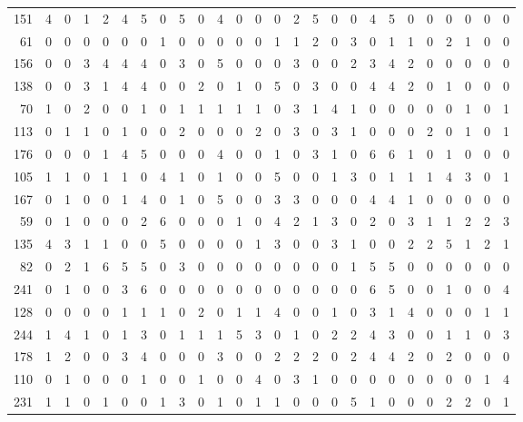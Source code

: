 \begin{longtable}{@{\extracolsep{\fill}}rccccccccccccccccccccccccc@{}}
151 & 4 & 0 & 1 & 2 & 4 & 5 & 0 & 5 & 0 & 4 & 0 & 0 & 0 & 2 & 5 & 0 & 0 & 4 & 5 & 0 & 0 & 0 & 0 & 0 & 0 \\
61 & 0 & 0 & 0 & 0 & 0 & 0 & 1 & 0 & 0 & 0 & 0 & 0 & 1 & 1 & 2 & 0 & 3 & 0 & 1 & 1 & 0 & 2 & 1 & 0 & 0 \\
156 & 0 & 0 & 3 & 4 & 4 & 4 & 0 & 3 & 0 & 5 & 0 & 0 & 0 & 3 & 0 & 0 & 2 & 3 & 4 & 2 & 0 & 0 & 0 & 0 & 0 \\
138 & 0 & 0 & 3 & 1 & 4 & 4 & 0 & 0 & 2 & 0 & 1 & 0 & 5 & 0 & 3 & 0 & 0 & 4 & 4 & 2 & 0 & 1 & 0 & 0 & 0 \\
70 & 1 & 0 & 2 & 0 & 0 & 1 & 0 & 1 & 1 & 1 & 1 & 1 & 0 & 3 & 1 & 4 & 1 & 0 & 0 & 0 & 0 & 0 & 1 & 0 & 1 \\
113 & 0 & 1 & 1 & 0 & 1 & 0 & 0 & 2 & 0 & 0 & 0 & 2 & 0 & 3 & 0 & 3 & 1 & 0 & 0 & 0 & 2 & 0 & 1 & 0 & 1 \\
176 & 0 & 0 & 0 & 1 & 4 & 5 & 0 & 0 & 0 & 4 & 0 & 0 & 1 & 0 & 3 & 1 & 0 & 6 & 6 & 1 & 0 & 1 & 0 & 0 & 0 \\
105 & 1 & 1 & 0 & 1 & 1 & 0 & 4 & 1 & 0 & 1 & 0 & 0 & 5 & 0 & 0 & 1 & 3 & 0 & 1 & 1 & 1 & 4 & 3 & 0 & 1 \\
167 & 0 & 1 & 0 & 0 & 1 & 4 & 0 & 1 & 0 & 5 & 0 & 0 & 3 & 3 & 0 & 0 & 0 & 4 & 4 & 1 & 0 & 0 & 0 & 0 & 0 \\
59 & 0 & 1 & 0 & 0 & 0 & 2 & 6 & 0 & 0 & 0 & 1 & 0 & 4 & 2 & 1 & 3 & 0 & 2 & 0 & 3 & 1 & 1 & 2 & 2 & 3 \\
135 & 4 & 3 & 1 & 1 & 0 & 0 & 5 & 0 & 0 & 0 & 0 & 1 & 3 & 0 & 0 & 3 & 1 & 0 & 0 & 2 & 2 & 5 & 1 & 2 & 1 \\
82 & 0 & 2 & 1 & 6 & 5 & 5 & 0 & 3 & 0 & 0 & 0 & 0 & 0 & 0 & 0 & 0 & 1 & 5 & 5 & 0 & 0 & 0 & 0 & 0 & 0 \\
241 & 0 & 1 & 0 & 0 & 3 & 6 & 0 & 0 & 0 & 0 & 0 & 0 & 0 & 0 & 0 & 0 & 0 & 6 & 5 & 0 & 0 & 1 & 0 & 0 & 4 \\
128 & 0 & 0 & 0 & 0 & 1 & 1 & 1 & 0 & 2 & 0 & 1 & 1 & 4 & 0 & 0 & 1 & 0 & 3 & 1 & 4 & 0 & 0 & 0 & 1 & 1 \\
244 & 1 & 4 & 1 & 0 & 1 & 3 & 0 & 1 & 1 & 1 & 5 & 3 & 0 & 1 & 0 & 2 & 2 & 4 & 3 & 0 & 0 & 1 & 1 & 0 & 3 \\
178 & 1 & 2 & 0 & 0 & 3 & 4 & 0 & 0 & 0 & 3 & 0 & 0 & 2 & 2 & 2 & 0 & 2 & 4 & 4 & 2 & 0 & 2 & 0 & 0 & 0 \\
110 & 0 & 1 & 0 & 0 & 0 & 1 & 0 & 0 & 1 & 0 & 0 & 4 & 0 & 3 & 1 & 0 & 0 & 0 & 0 & 0 & 0 & 0 & 0 & 1 & 4 \\
231 & 1 & 1 & 0 & 1 & 0 & 0 & 1 & 3 & 0 & 1 & 0 & 1 & 1 & 0 & 0 & 0 & 5 & 1 & 0 & 0 & 0 & 2 & 2 & 0 & 1 \\

\end{longtable}
